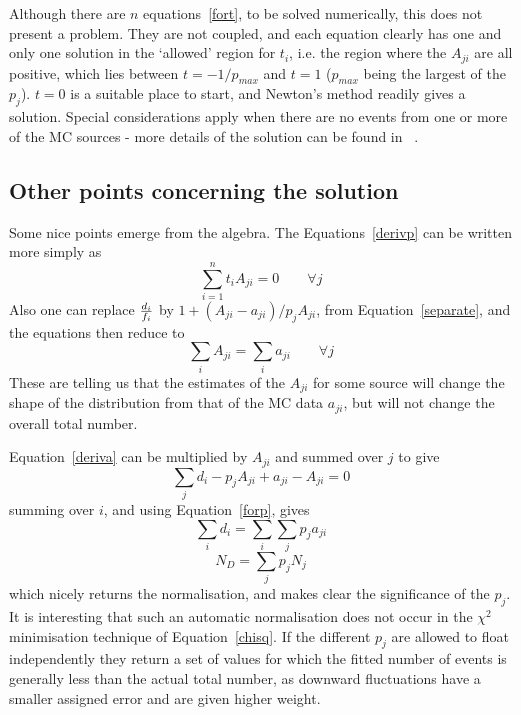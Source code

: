 \begin{changebar}
Although there are $n$ equations~\ref{fort}, to be solved numerically,
this does not present a problem.  They are not coupled, and
each equation
clearly has one and only one solution in the `allowed' region for $t_i$,
i.e. the region where the $A_{ji}$ are all positive,
which lies between $t=-1/p_{max}$ and $t=1$
($p_{max}$ being the largest of the $p_j$).
$t=0$ is a suitable place to start, and Newton's method readily gives a
solution.
Special considerations apply when there are no events from one or more of the
MC sources - more details of the solution can be found in ~\cite{bib-FINITEMC}.
 
 
\subsection*{Other points concerning the solution}
 
Some nice points emerge from the algebra.
The Equations~\ref{derivp}  can be written more simply as
\begin{equation}
\sum_{i=1}^n t_i A_{ji}=0\qquad \forall j \label{newderivp}
\end{equation}
Also one can replace ${d_i \over  f_i}$ by $1+(A_{ji}-a_{ji})/p_j A_{ji}$,
from Equation~\ref{separate}, and the equations then reduce to
\begin{equation}
\sum_i A_{ji} = \sum_i a_{ji}\qquad \forall j\label{forp}
\end{equation}
These are telling us that the estimates of the $A_{ji}$ for some source will
change the shape of the distribution from that of the MC data $a_{ji}$,
but will not change the overall total number.
 
Equation~\ref{deriva}
can be multiplied by $A_{ji}$ and summed over $j$
to give
$$\sum_j d_i -  p_j A_{ji}
+ a_{ji} - A_{ji}=0$$
summing over $i$, and using Equation~\ref{forp}, gives
$$\sum_i d_i = \sum_i \sum_j p_j a_{ji}$$
\begin{equation}
N_D = \sum_j p_j N_j \label{normal}
\end{equation}
which nicely returns the normalisation, and makes clear the
significance of the $p_j$.
It is interesting that such an automatic normalisation does not occur in
the $\chi^2$ minimisation technique of Equation~\ref{chisq}.
If the different $p_j$ are allowed to float independently they return
a set of values for which the
fitted number of events is generally less than the actual total number,
as downward fluctuations have a smaller assigned error and are given higher weight.
 

\end{changebar}
